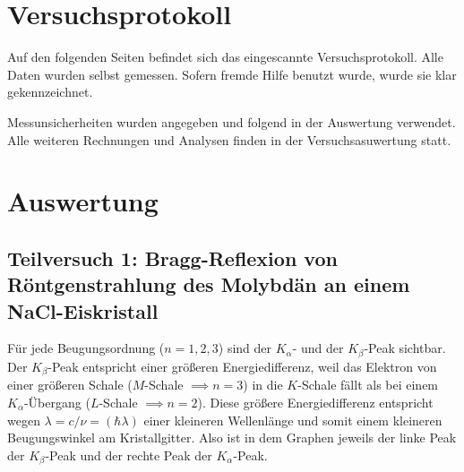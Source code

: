\documentclass{article}
\begin{document}
\newpage

\section{Versuchsprotokoll}

Auf den folgenden Seiten befindet sich das eingescannte Versuchsprotokoll. Alle Daten wurden selbst gemessen. Sofern fremde Hilfe benutzt wurde, wurde sie klar gekennzeichnet.

Messunsicherheiten wurden angegeben und folgend in der Auswertung verwendet. Alle weiteren Rechnungen und Analysen finden in der Versuchsasuwertung statt.

% 


\newpage


\section{Auswertung}

\subsection{Teilversuch 1: Bragg-Reflexion von Röntgenstrahlung des Molybdän
an einem NaCl-Eiskristall}

Für jede Beugungsordnung ($n = 1, 2, 3$) sind der $K_\alpha$- und der
$K_\beta$-Peak sichtbar. Der $K_\beta$-Peak entspricht einer größeren
Energiedifferenz, weil das Elektron von einer größeren Schale
($M$-Schale $\implies n = 3$) in die $K$-Schale fällt als bei einem
$K_\alpha$-Übergang ($L$-Schale $\implies n = 2$).
Diese größere Energiedifferenz entspricht wegen
$\lambda = c / \nu = (\hbar \lambda)$ einer kleineren Wellenlänge
und somit einem kleineren Beugungswinkel am Kristallgitter.
Also ist in dem Graphen jeweils der linke Peak der $K_\beta$-Peak
und der rechte Peak der $K_\alpha$-Peak.
\end{document}
